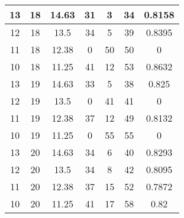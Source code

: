 \documentclass[letterpaper, 12pt]{article}
\begin{document}
\begin{longtable}{|c|c|c|c|c|c|c|}
\hline
13 & 18 & 14.63 & 31 & 3 & 34 & 0.8158 \\
\hline
12 & 18 & 13.5 & 34 & 5 & 39 & 0.8395 \\
\hline
11 & 18 & 12.38 & 0 & 50 & 50 & 0 \\
\hline
10 & 18 & 11.25 & 41 & 12 & 53 & 0.8632 \\
\hline
13 & 19 & 14.63 & 33 & 5 & 38 & 0.825 \\
\hline
12 & 19 & 13.5 & 0 & 41 & 41 & 0 \\
\hline
11 & 19 & 12.38 & 37 & 12 & 49 & 0.8132 \\
\hline
10 & 19 & 11.25 & 0 & 55 & 55 & 0 \\
\hline
13 & 20 & 14.63 & 34 & 6 & 40 & 0.8293 \\
\hline
12 & 20 & 13.5 & 34 & 8 & 42 & 0.8095 \\
\hline
11 & 20 & 12.38 & 37 & 15 & 52 & 0.7872 \\
\hline
10 & 20 & 11.25 & 41 & 17 & 58 & 0.82 \\
\hline
\end{longtable}
\end{document}
